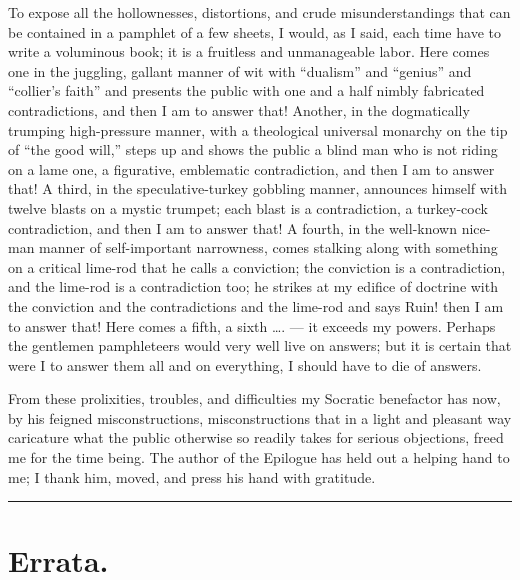 \documentclass[12pt]{book}
\newcommand{\opage}[1]{\marginnote{\footnotesize\textit{[#1]}}}
\begin{document}
To expose all the hollownesses, distortions, and crude misunderstandings
that can be contained in a pamphlet of a few sheets, I would, as I said,
each time have to write a voluminous book; it is a fruitless and
unmanageable labor. Here comes one in the juggling, gallant manner of wit
with ``dualism'' and ``genius'' and ``collier's faith'' and presents the
public with one and a half nimbly fabricated contradictions, and then I am
to answer that! Another, in the dogmatically trumping high-pressure
manner, with a theological universal monarchy on the tip of ``the good
will,'' steps up and shows the public a blind man who is not riding on a
lame one, a figurative, emblematic contradiction, and then I am to answer
that! A third, in the speculative-turkey gobbling manner, announces
himself with twelve blasts on a mystic trumpet; each blast is a
contradiction, a turkey-cock contradiction, and then I am to answer that!
A fourth, in the well-known nice-man manner of self-important narrowness,
comes stalking along with something on a critical lime-rod that he calls
a conviction; the conviction is a contradiction, and the lime-rod is a
contradiction too; he strikes at my edifice of doctrine with the
conviction and the contradictions and the lime-rod and says Ruin! then I
am to answer that! Here comes a fifth, a sixth \ldots. --- it exceeds my
powers. Perhaps the gentlemen pamphleteers would very well live on
answers; but it is certain that were I to answer them all and on
everything, I should have to die of answers.

From these prolixities, troubles, and difficulties
\opage{326}\setcounter{footnote}{0}%
my Socratic benefactor has now, by his feigned misconstructions,
misconstructions that in a light and pleasant way caricature what the
public otherwise so readily takes for serious objections, freed me for the
time being. The author of the Epilogue has held out a helping hand to me;
I thank him, moved, and press his hand with gratitude.

\begin{center}\rule{3cm}{0.4pt}\end{center}

\backmatter
\chapter*{Errata.}
\end{document}
